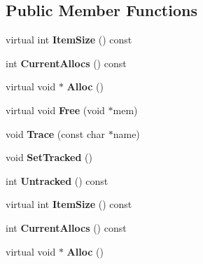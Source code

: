 \subsection*{Public Member Functions}
\begin{DoxyCompactItemize}
\item 
\mbox{\label{classtinyxml2_1_1MemPoolT_a0d808a013738c549fe675e0c125bcad8}} 
virtual int {\bfseries Item\+Size} () const
\item 
\mbox{\label{classtinyxml2_1_1MemPoolT_acafff0b90381d30902bbae54eb1c0b28}} 
int {\bfseries Current\+Allocs} () const
\item 
\mbox{\label{classtinyxml2_1_1MemPoolT_aa9d785a48ffe6ea1be679bab13464486}} 
virtual void $\ast$ {\bfseries Alloc} ()
\item 
\mbox{\label{classtinyxml2_1_1MemPoolT_a4f1a0c434e9e3d7391e5c16ed4ee8c70}} 
virtual void {\bfseries Free} (void $\ast$mem)
\item 
\mbox{\label{classtinyxml2_1_1MemPoolT_a0bc596f271e0f139822c534238b3f244}} 
void {\bfseries Trace} (const char $\ast$name)
\item 
\mbox{\label{classtinyxml2_1_1MemPoolT_a7798932414916199a1bc0f9c3f368521}} 
void {\bfseries Set\+Tracked} ()
\item 
\mbox{\label{classtinyxml2_1_1MemPoolT_a365d95526f22abe08e306d63e30c0b51}} 
int {\bfseries Untracked} () const
\item 
\mbox{\label{classtinyxml2_1_1MemPoolT_a0d808a013738c549fe675e0c125bcad8}} 
virtual int {\bfseries Item\+Size} () const
\item 
\mbox{\label{classtinyxml2_1_1MemPoolT_acafff0b90381d30902bbae54eb1c0b28}} 
int {\bfseries Current\+Allocs} () const
\item 
\mbox{\label{classtinyxml2_1_1MemPoolT_aa9d785a48ffe6ea1be679bab13464486}} 
virtual void $\ast$ {\bfseries Alloc} ()

\end{DoxyCompactItemize}
